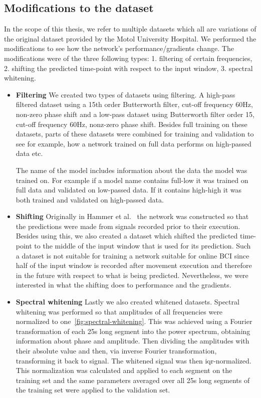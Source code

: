 \subsection{Modifications to the dataset}\label{subsec:modifications-to-the-dataset}
In the scope of this thesis, we refer to multiple datasets which all are variations of the original dataset provided by the Motol University Hospital.
We performed the modifications to see how the network's performance/gradients change.
The modifications were of the three following types: 1. filtering of certain frequencies, 2. shifting the predicted time-point with respect to the input window, 3. spectral whitening.
\begin{itemize}
\item \textbf{Filtering} We created two types of datasets using filtering.
A high-pass filtered dataset using a 15th order Butterworth filter, cut-off frequency 60Hz, non-zero phase shift and a low-pass dataset using Butterworth filter order 15, cut-off frequency 60Hz, nonz-zero phase shift.
Besides full training on these datasets, parts of these datasets were combined for training and validation to see for example, how a network trained on full data performs on high-passed data etc.

The name of the model includes information about the data the model was trained on.
For example if a model name contains full-low it was trained on full data and validated on low-passed data.
If it contains high-high it was both trained and validated on high-passed data.

\item \textbf{Shifting} Originally in Hammer et al.~\cite{Hammer-2021} the network was constructed so that the predictions were made from signals recorded prior to their execution.
Besides using this, we also created a dataset which shifted the predicted time-point to the middle of the input window that is used for its prediction.
Such a dataset is not suitable for training a network suitable for online BCI since half of the input window is recorded after movement execution and therefore in the future with respect to what is being predicted.
Nevertheless, we were interested in what the shifting does to performance and the gradients.


\item \textbf{Spectral whitening} Lastly we also created whitened datasets.
Spectral whitening was performed so that amplitudes of all frequencies were normalized to one~\ref{fig:spectral-whitening}.
This was achieved using a Fourier transformation of each 25s long segment into the power spectrum, obtaining information about phase and amplitude.
Then dividing the amplitudes with their absolute value and then, via inverse Fourier transformation, transforming it back to signal.
The whitened signal was then iqr-normalized.
This normalization was calculated and applied to each segment on the training set and the same parameters averaged over all 25s long segments of the training set were applied to the validation set.


\end{itemize}
